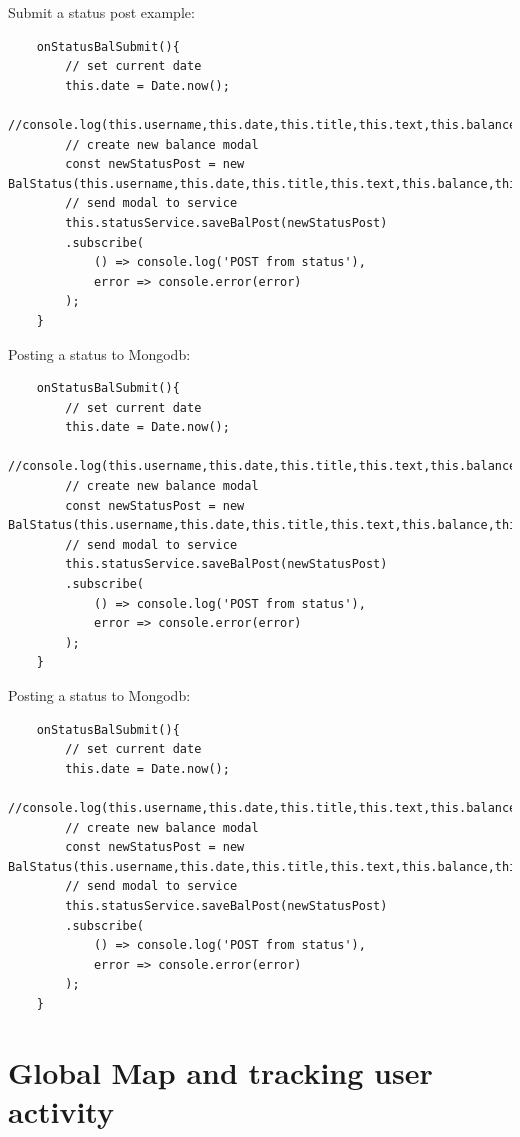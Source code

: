 Submit a status post example:
\begin{lstlisting}
    onStatusBalSubmit(){
        // set current date
        this.date = Date.now();
        //console.log(this.username,this.date,this.title,this.text,this.balance,this.lat,this.long)
        // create new balance modal
        const newStatusPost = new BalStatus(this.username,this.date,this.title,this.text,this.balance,this.lat,this.long);
        // send modal to service
        this.statusService.saveBalPost(newStatusPost)
        .subscribe(
            () => console.log('POST from status'),
            error => console.error(error)
        );
    }

\end{lstlisting}

Posting a status to Mongodb:
\begin{lstlisting}
    onStatusBalSubmit(){
        // set current date
        this.date = Date.now();
        //console.log(this.username,this.date,this.title,this.text,this.balance,this.lat,this.long)
        // create new balance modal
        const newStatusPost = new BalStatus(this.username,this.date,this.title,this.text,this.balance,this.lat,this.long);
        // send modal to service
        this.statusService.saveBalPost(newStatusPost)
        .subscribe(
            () => console.log('POST from status'),
            error => console.error(error)
        );
    }

\end{lstlisting}

Posting a status to Mongodb:
\begin{lstlisting}
    onStatusBalSubmit(){
        // set current date
        this.date = Date.now();
        //console.log(this.username,this.date,this.title,this.text,this.balance,this.lat,this.long)
        // create new balance modal
        const newStatusPost = new BalStatus(this.username,this.date,this.title,this.text,this.balance,this.lat,this.long);
        // send modal to service
        this.statusService.saveBalPost(newStatusPost)
        .subscribe(
            () => console.log('POST from status'),
            error => console.error(error)
        );
    }

\end{lstlisting}

\section{Global Map and tracking user activity}

